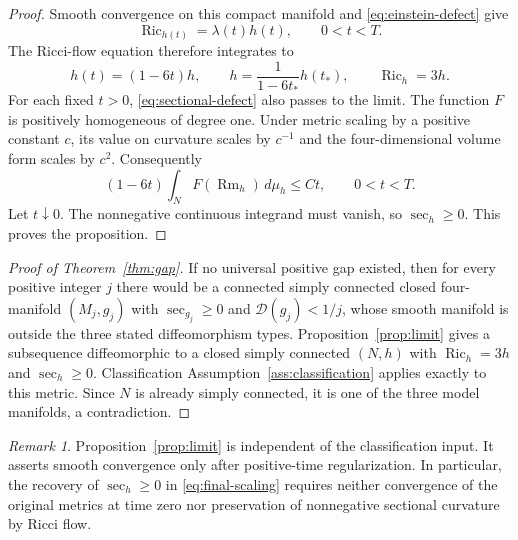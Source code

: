 \documentclass[11pt]{article}
\theoremstyle{definition}
\theoremstyle{remark}
\newtheorem{remark}[theorem]{Remark}
\numberwithin{equation}{section}
\DeclareMathOperator{\Ric}{Ric}
\DeclareMathOperator{\Rm}{Rm}
\begin{document}
\begin{proof}
Smooth convergence on this compact manifold and
\eqref{eq:einstein-defect} give
\[
 \Ric_{h(t)}=\lambda(t)h(t),\qquad 0<t<T.
\]
The Ricci-flow equation therefore integrates to
\[
 h(t)=(1-6t)h,\qquad
 h=\frac{1}{1-6t_*}h(t_*),\qquad \Ric_h=3h.
\]
For each fixed $t>0$, \eqref{eq:sectional-defect} also passes to the
limit. The function $F$ is positively homogeneous of degree one.
Under metric scaling by a positive constant $c$, its value on curvature
scales by $c^{-1}$ and the four-dimensional volume form scales by $c^2$.
Consequently
\begin{equation}\label{eq:final-scaling}
 (1-6t)\int_NF(\Rm_h)\,d\mu_h\le Ct,
 \qquad 0<t<T.
\end{equation}
Let $t\downarrow0$. The nonnegative continuous integrand must vanish,
so $\sec_h\ge0$. This proves the proposition.
\end{proof}

\begin{proof}[Proof of Theorem~\ref{thm:gap}]
If no universal positive gap existed, then for every positive integer
$j$ there would be a connected simply connected closed four-manifold
$(M_j,g_j)$ with $\sec_{g_j}\ge0$ and $\mathcal D(g_j)<1/j$, whose
smooth manifold is outside the three stated diffeomorphism types.
Proposition~\ref{prop:limit} gives a subsequence diffeomorphic to a
closed simply connected $(N,h)$ with $\Ric_h=3h$ and $\sec_h\ge0$.
Classification Assumption~\ref{ass:classification} applies exactly
to this metric. Since $N$ is already simply connected, it is one of
the three model manifolds, a contradiction.
\end{proof}

\begin{remark}
Proposition~\ref{prop:limit} is independent of the classification
input. It asserts smooth convergence only after positive-time
regularization. In particular, the recovery of $\sec_h\ge0$ in
\eqref{eq:final-scaling} requires neither convergence of the original
metrics at time zero nor preservation of nonnegative sectional
curvature by Ricci flow.
\end{remark}



\end{document}

